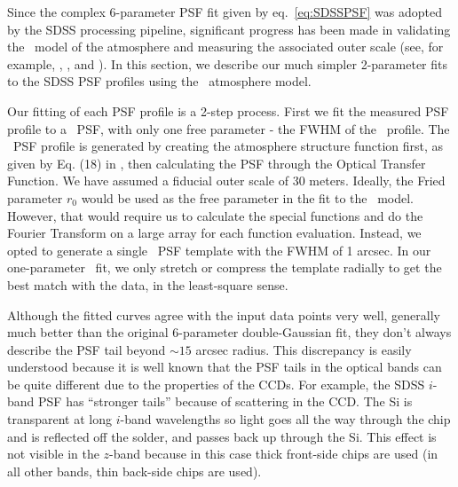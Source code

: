 

Since the complex 6-parameter PSF fit given by eq.~\ref{eq:SDSSPSF} was adopted by 
the SDSS processing pipeline, significant progress has been made in validating the 
\vk~model of the atmosphere and measuring the associated outer
scale (see, for example, \citealt{Tokovinin2002}, \citealt{Boccas2004}, and \citealt{MartinezMessenger}).
In this section, we describe our much simpler 2-parameter fits to the SDSS PSF
profiles using the \vk~atmosphere model.

Our fitting of each PSF profile is a 2-step process. First we fit the
measured PSF profile to a \vk~PSF, with only one free parameter -
the FWHM of the \vk~profile.  The \vk~PSF profile is generated by creating the atmosphere
structure function first, as given by Eq. (18) in \cite{Tokovinin2002}, then calculating the
PSF through the Optical Transfer Function. We have assumed a fiducial
outer scale of 30 meters.
Ideally, the Fried parameter $r_0$ would be used as the free
parameter in the fit to the \vk~model. However, 
that would require us to calculate the special functions and do the
Fourier Transform on a large array for each function evaluation.
Instead, we opted to generate a single \vk~PSF template with the FWHM of 
1 arcsec. In our one-parameter \vk~fit, we only stretch or compress
the template radially to get the best match with the data, in the
least-square sense.


Although the fitted
curves agree with the input data points very well, generally much better than the
original 6-parameter double-Gaussian fit, they don't always describe
the PSF tail beyond $\sim 15$ arcsec radius. This discrepancy is easily understood
because it is well known that the PSF tails in the optical bands can be quite
different due to the properties of the CCDs.
For example, the SDSS $i$-band PSF has ``stronger tails''
because of scattering in the CCD.  The Si is transparent at long $i$-band wavelengths 
so light goes all the way through the chip and is reflected off the solder, and passes 
back up through the Si. This effect is not visible in the $z$-band because in this case
thick front-side chips are used (in all other bands, thin back-side chips are used). 

